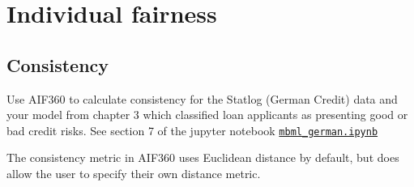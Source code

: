 \section{Individual fairness}\label{app_AIF360_IF}

\subsection{Consistency}

\begin{lookbox}
Use AIF360 to calculate consistency for the Statlog (German Credit) data and your model from chapter 3 which classified loan applicants as presenting good or bad credit risks. See section 7 of the jupyter notebook \href{https://github.com/leenamurgai/mitigatingbiasml/blob/master/code/source/mbml-german.ipynb}{\texttt{mbml\_german.ipynb}}
\end{lookbox}

The consistency metric in AIF360 uses Euclidean distance by default, but does allow the user to specify their own distance metric. 

